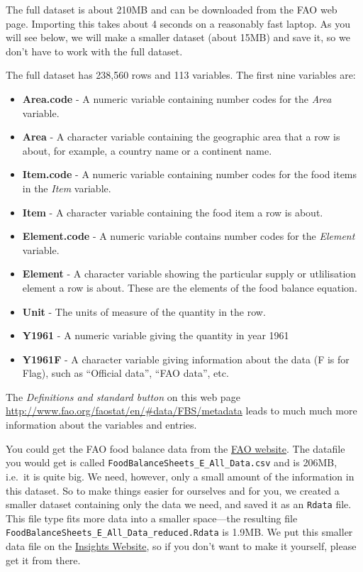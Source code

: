 \documentclass[]{book}
\providecommand{\tightlist}{%
  \setlength{\itemsep}{0pt}\setlength{\parskip}{0pt}}
\begin{document}
The full dataset is about 210MB and can be downloaded from the FAO web page. Importing this takes about 4 seconds on a reasonably fast laptop. As you will see below, we will make a smaller dataset (about 15MB) and save it, so we don't have to work with the full dataset.

The full dataset has 238,560 rows and 113 variables. The first nine variables are:

\begin{itemize}
\tightlist
\item
  \textbf{Area.code} - A numeric variable containing number codes for the \emph{Area} variable.
\item
  \textbf{Area} - A character variable containing the geographic area that a row is about, for example, a country name or a continent name.
\item
  \textbf{Item.code} - A numeric variable containing number codes for the food items in the \emph{Item} variable.
\item
  \textbf{Item} - A character variable containing the food item a row is about.
\item
  \textbf{Element.code} - A numeric variable contains number codes for the \emph{Element} variable.
\item
  \textbf{Element} - A character variable showing the particular supply or utlilisation element a row is about. These are the elements of the food balance equation.
\item
  \textbf{Unit} - The units of measure of the quantity in the row.
\item
  \textbf{Y1961} - A numeric variable giving the quantity in year 1961
\item
  \textbf{Y1961F} - A character variable giving information about the data (F is for Flag), such as ``Official data'', ``FAO data'', etc.
\end{itemize}

The \emph{Definitions and standard button} on this web page \url{http://www.fao.org/faostat/en/\#data/FBS/metadata} leads to much much more information about the variables and entries.

You could get the FAO food balance data from the \href{http://www.fao.org/faostat/en/\#data/FBS/metadata}{FAO website}. The datafile you would get is called \texttt{FoodBalanceSheets\_E\_All\_Data.csv} and is 206MB, i.e.~it is quite big. We need, however, only a small amount of the information in this dataset. So to make things easier for ourselves and for you, we created a smaller dataset containing only the data we need, and saved it as an \texttt{Rdata} file. This file type fits more data into a smaller space---the resulting file \texttt{FoodBalanceSheets\_E\_All\_Data\_reduced.Rdata} is 1.9MB. We put this smaller data file on the \href{insightsfromdata.io}{Insights Website}, so if you don't want to make it yourself, please get it from there.
\end{document}
